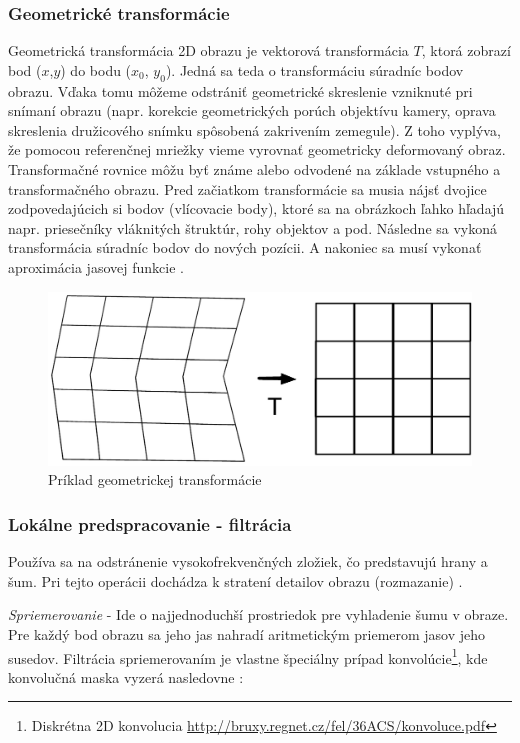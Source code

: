 \subsubsection{Geometrické transformácie}
Geometrická transformácia 2D obrazu je vektorová transformácia $T$, ktorá zobrazí bod ($x$,$y$) do bodu ($x_0$, $y_0$).  Jedná sa teda o transformáciu súradníc bodov obrazu. Vďaka tomu môžeme odstrániť geometrické skreslenie vzniknuté pri snímaní obrazu (napr. korekcie geometrických porúch objektívu kamery, oprava skreslenia družicového snímku spôsobená zakrivením zemegule).  Z toho vyplýva, že pomocou referenčnej mriežky vieme vyrovnať geometricky deformovaný obraz. Transformačné rovnice môžu byť známe alebo odvodené na základe vstupného a transformačného  obrazu. Pred začiatkom transformácie sa musia nájsť dvojice zodpovedajúcich si bodov (vlícovacie body), ktoré sa na obrázkoch ľahko hľadajú napr. priesečníky vláknitých štruktúr, rohy objektov a pod. Následne sa vykoná transformácia súradníc bodov do nových pozícii. A nakoniec sa musí vykonať aproximácia jasovej funkcie  \cite{Algorithms_and_Applications}.

\begin{figure}[H]
\begin{center}
	\includegraphics[scale=0.4]{images/transform}
	\caption{Príklad geometrickej transformácie}
	\end{center}
\end{figure}

\subsubsection{Lokálne predspracovanie - filtrácia}
Používa sa na odstránenie vysokofrekvenčných zložiek, čo predstavujú hrany a šum. Pri tejto operácii dochádza k stratení detailov obrazu (rozmazanie)  \cite{Detekcia_a_rozpoznavanie_objektov}.

\textit{Spriemerovanie} - Ide o najjednoduchší prostriedok pre vyhladenie šumu v obraze. Pre každý bod obrazu sa jeho jas nahradí aritmetickým priemerom jasov jeho susedov. Filtrácia spriemerovaním je vlastne špeciálny prípad konvolúcie\footnote{Diskrétna 2D konvolucia \url{http://bruxy.regnet.cz/fel/36ACS/konvoluce.pdf}}, kde konvolučná maska vyzerá nasledovne \cite{Detekcia_a_rozpoznavanie_objektov}:

